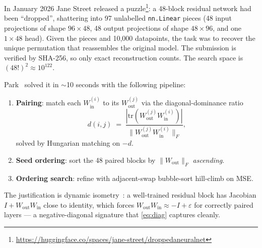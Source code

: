 \documentclass[10pt]{article}
\theoremstyle{remark}
\begin{document}
In January 2026 Jane Street released a puzzle\footnote{\url{https://huggingface.co/spaces/jane-street/droppedaneuralnet}}:
a 48-block residual network had been ``dropped'', shattering into 97
unlabelled \texttt{nn.Linear} pieces (48 input projections of shape $96\times 48$,
48 output projections of shape $48\times 96$, and one $1\times 48$ head).
Given the pieces and 10,000 datapoints, the task was to recover the unique
permutation that reassembles the original model. The submission is verified
by SHA-256, so only exact reconstruction counts. The search space is
$(48!)^2 \approx 10^{122}$.

Park~\cite{park2026} solved it in $\sim$10 seconds with the following
pipeline:
\begin{enumerate}[leftmargin=*,itemsep=0pt]
  \item \textbf{Pairing}: match each $W_{\mathrm{in}}^{(i)}$ to its
        $W_{\mathrm{out}}^{(j)}$ via the diagonal-dominance ratio
        \begin{equation}\label{eq:diag}
          d(i,j) \;=\; \frac{|\mathrm{tr}(W_{\mathrm{out}}^{(j)} W_{\mathrm{in}}^{(i)})|}{\|W_{\mathrm{out}}^{(j)} W_{\mathrm{in}}^{(i)}\|_F},
        \end{equation}
        solved by Hungarian matching on $-d$.
  \item \textbf{Seed ordering}: sort the 48 paired blocks by $\|W_{\mathrm{out}}\|_F$ \emph{ascending}.
  \item \textbf{Ordering search}: refine with adjacent-swap bubble-sort hill-climb on MSE.
\end{enumerate}
The justification is dynamic isometry~\cite{pennington2017isometry}: a
well-trained residual block has Jacobian $I + W_{\mathrm{out}}W_{\mathrm{in}}$
close to identity, which forces $W_{\mathrm{out}}W_{\mathrm{in}} \approx -I + \varepsilon$
for correctly paired layers --- a negative-diagonal signature that
\eqref{eq:diag} captures cleanly.
\end{document}
